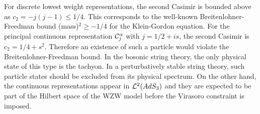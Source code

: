 For discrete lowest weight representations, 
the second Casimir is bounded  above 
as $c_2=-j(j-1) \leq 1/4$. 
This corresponds to the well-known
Breitenlohner-Freedman bound (mass)$^2 \geq -1/4$
for the Klein-Gordon equation.
For the principal continuous representation
${\cal C}_j^\alpha$ with $j=1/2 + i s$,
the second Casimir is $c_2 =  1/4 + s^2$.
Therefore an existence of such a particle would
violate the Breitenlohner-Freedman bound. 
In the bosonic string theory, the only physical
state of this type is the tachyon. In 
a perturbatively stable string theory, such
particle states should be excluded from its
physical spectrum.
On the other hand, 
the continuous representations 
appear in ${\cal L}^2(AdS_3)$
and they
are expected to be part of the Hilbert space of the WZW 
model before the Virasoro constraint is imposed.


